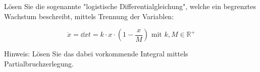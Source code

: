 \item Lösen Sie die sogenannte "logistische Differentialgleichung", welche ein begrenztes Wachstum beschreibt, mittels Trennung der Variablen: 

$$\dot x= \dd{x}{t} = k \cdot x \cdot (1-\frac{x}{M}) \text{ mit } k,M \in \mathbb{R}^{+}$$

Hinweis: Lösen Sie das dabei vorkommende Integral mittels Partialbruchzerlegung.

